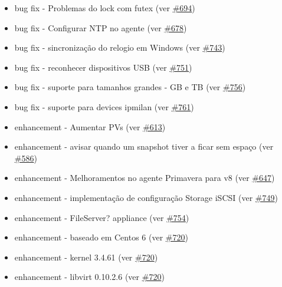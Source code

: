 \begin{itemize}
	\item bug fix - Problemas do lock com futex (ver \href{https://srcmaster.eurotux.com/pm/p/etva/ticket/694}{\#694})
	\item bug fix - Configurar NTP no agente (ver \href{https://srcmaster.eurotux.com/pm/p/etva/ticket/678}{\#678})
	\item bug fix - sincronização do relogio em Windows (ver \href{https://srcmaster.eurotux.com/pm/p/etva/ticket/743}{\#743})
	\item bug fix - reconhecer dispositivos USB (ver \href{https://srcmaster.eurotux.com/pm/p/etva/ticket/751}{\#751})
	\item bug fix - suporte para tamanhos grandes - GB e TB (ver \href{https://srcmaster.eurotux.com/pm/p/etva/ticket/756}{\#756})
	\item bug fix - suporte para devices ipmilan (ver \href{https://srcmaster.eurotux.com/pm/p/etva/ticket/761}{\#761})
	\item enhancement - Aumentar PVs (ver \href{https://srcmaster.eurotux.com/pm/p/etva/ticket/613}{\#613})
	\item enhancement - avisar quando um snapshot tiver a ficar sem espaço (ver \href{https://srcmaster.eurotux.com/pm/p/etva/ticket/586}{\#586})
	\item enhancement - Melhoramentos no agente Primavera para v8 (ver \href{https://srcmaster.eurotux.com/pm/p/etva/ticket/647}{\#647})
	\item enhancement - implementação de configuração Storage iSCSI (ver \href{https://srcmaster.eurotux.com/pm/p/etva/ticket/749}{\#749})
	\item enhancement - FileServer? appliance (ver \href{https://srcmaster.eurotux.com/pm/p/etva/ticket/754}{\#754})
	\item enhancement - baseado em Centos 6 (ver \href{https://srcmaster.eurotux.com/pm/p/etva/ticket/720}{\#720})
	\item enhancement - kernel 3.4.61 (ver \href{https://srcmaster.eurotux.com/pm/p/etva/ticket/720}{\#720})
	\item enhancement - libvirt 0.10.2.6 (ver \href{https://srcmaster.eurotux.com/pm/p/etva/ticket/720}{\#720})
\end{itemize}


